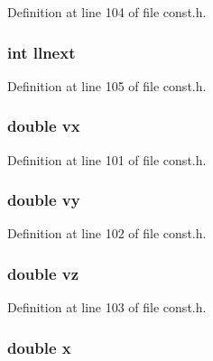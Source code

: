 Definition at line 104 of file const.\+h.

\hypertarget{structparticle_a249c9992214ca0e4e230f9f494b42cb9}{}
\subsubsection[{llnext}]{\setlength{\rightskip}{0pt plus 5cm}int llnext}\label{structparticle_a249c9992214ca0e4e230f9f494b42cb9}


Definition at line 105 of file const.\+h.

\hypertarget{structparticle_a2d31cc80a747457c212675a58c68b2b1}{}
\subsubsection[{vx}]{\setlength{\rightskip}{0pt plus 5cm}double vx}\label{structparticle_a2d31cc80a747457c212675a58c68b2b1}


Definition at line 101 of file const.\+h.

\hypertarget{structparticle_a42e75115788e629a258d041808d822a0}{}
\subsubsection[{vy}]{\setlength{\rightskip}{0pt plus 5cm}double vy}\label{structparticle_a42e75115788e629a258d041808d822a0}


Definition at line 102 of file const.\+h.

\hypertarget{structparticle_a7eddee930e55c61ba8cd3506c1ac5fc1}{}
\subsubsection[{vz}]{\setlength{\rightskip}{0pt plus 5cm}double vz}\label{structparticle_a7eddee930e55c61ba8cd3506c1ac5fc1}


Definition at line 103 of file const.\+h.

\hypertarget{structparticle_af88b946fb90d5f08b5fb740c70e98c10}{}
\subsubsection[{x}]{\setlength{\rightskip}{0pt plus 5cm}double x}\label{structparticle_af88b946fb90d5f08b5fb740c70e98c10}



